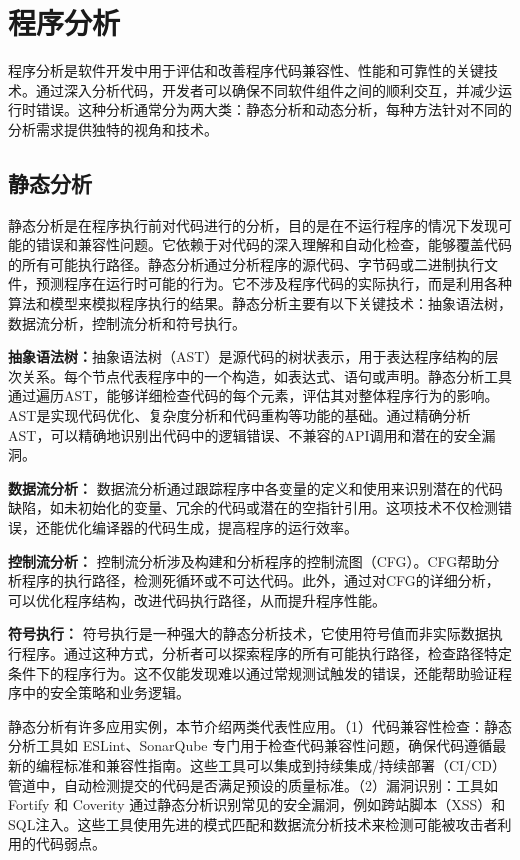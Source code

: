 \section{程序分析}
程序分析是软件开发中用于评估和改善程序代码兼容性、性能和可靠性的关键技术。通过深入分析代码，开发者可以确保不同软件组件之间的顺利交互，并减少运行时错误。这种分析通常分为两大类：静态分析和动态分析，每种方法针对不同的分析需求提供独特的视角和技术。

\subsection{静态分析}
静态分析是在程序执行前对代码进行的分析，目的是在不运行程序的情况下发现可能的错误和兼容性问题。它依赖于对代码的深入理解和自动化检查，能够覆盖代码的所有可能执行路径。静态分析通过分析程序的源代码、字节码或二进制执行文件，预测程序在运行时可能的行为。它不涉及程序代码的实际执行，而是利用各种算法和模型来模拟程序执行的结果。静态分析主要有以下关键技术：抽象语法树，数据流分析，控制流分析和符号执行。

\textbf{抽象语法树：}抽象语法树（AST）是源代码的树状表示，用于表达程序结构的层次关系。每个节点代表程序中的一个构造，如表达式、语句或声明。静态分析工具通过遍历AST，能够详细检查代码的每个元素，评估其对整体程序行为的影响。AST是实现代码优化、复杂度分析和代码重构等功能的基础。通过精确分析AST，可以精确地识别出代码中的逻辑错误、不兼容的API调用和潜在的安全漏洞。

\textbf{数据流分析：} 数据流分析通过跟踪程序中各变量的定义和使用来识别潜在的代码缺陷，如未初始化的变量、冗余的代码或潜在的空指针引用。这项技术不仅检测错误，还能优化编译器的代码生成，提高程序的运行效率。

\textbf{控制流分析：} 控制流分析涉及构建和分析程序的控制流图（CFG）。CFG帮助分析程序的执行路径，检测死循环或不可达代码。此外，通过对CFG的详细分析，可以优化程序结构，改进代码执行路径，从而提升程序性能。

\textbf{符号执行：} 符号执行是一种强大的静态分析技术，它使用符号值而非实际数据执行程序。通过这种方式，分析者可以探索程序的所有可能执行路径，检查路径特定条件下的程序行为。这不仅能发现难以通过常规测试触发的错误，还能帮助验证程序中的安全策略和业务逻辑。

静态分析有许多应用实例，本节介绍两类代表性应用。（1）代码兼容性检查：静态分析工具如 ESLint、SonarQube 专门用于检查代码兼容性问题，确保代码遵循最新的编程标准和兼容性指南。这些工具可以集成到持续集成/持续部署（CI/CD）管道中，自动检测提交的代码是否满足预设的质量标准。（2）漏洞识别：工具如 Fortify 和 Coverity 通过静态分析识别常见的安全漏洞，例如跨站脚本（XSS）和SQL注入。这些工具使用先进的模式匹配和数据流分析技术来检测可能被攻击者利用的代码弱点。

